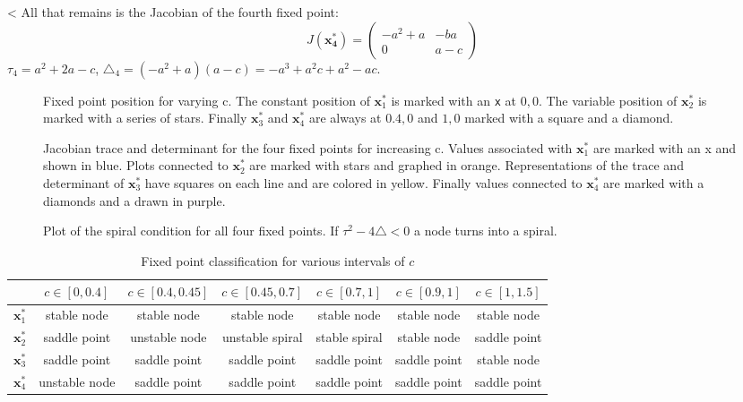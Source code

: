 <
All that remains is the Jacobian of the fourth fixed point:
\begin{equation}
J(\mathbf{x_4^*}) = \begin{pmatrix}
-a ^2 + a & -ba \\
0 & a-c 
\end{pmatrix}
\label{eq:Jx4}
\end{equation}
$\tau_4 = a^2 + 2a -c$, $\triangle_4 = (-a ^2 + a)(a-c)= -a^3 + a^2c + a^2 - ac$. 

\begin{figure}
\centering

\caption{Fixed point position for varying c. The constant position of $\mathbf{x}_1^*$ is marked with an \texttt{x} at $0,0$. The variable position of $\mathbf{x}_2^*$ is marked with a series of stars. Finally $\mathbf{x}_3^*$ and $\mathbf{x}_4^*$ are always at $0.4,0$ and $1,0$ marked with a square and a diamond.}




\caption{Jacobian trace and determinant for the four fixed points for increasing c. Values associated with $\mathbf{x}_1^*$ are marked with an x and shown in blue. Plots connected to $\mathbf{x}_2^*$ are marked with stars and graphed in orange. Representations of the trace and determinant of $\mathbf{x}_3^*$ have squares on each line and are colored in yellow. Finally values connected to $\mathbf{x}_4^*$ are marked with a diamonds and a drawn in purple.}
\end{figure}
\begin{figure}
\centering

\caption{Plot of the spiral condition for all four fixed points. If $\tau^2 - 4\triangle < 0$ a node turns into a spiral.}
\end{figure}

\begin{table}
\begin{tabular}{|c|c|c|c|c|c|c|}
\hline
				 &	$c \in [0,0.4] $ & $c \in [0.4,0.45] $ & $c \in [0.45,0.7] $ & $c \in [0.7,1]$ & $c \in [0.9,1]$ & $c \in [1,1.5] $  \\
\hline
$\mathbf{x}_1^*$ &	stable node		 &	stable node		   &	stable node 	 &	 stable node   & stable node  & stable node  	\\
\hline
$\mathbf{x}_2^*$ &	saddle point	 &	unstable node	   &	unstable spiral	 & stable spiral   & stable node  &	saddle point   \\
\hline
$\mathbf{x}_3^*$ &	saddle point	 & saddle point		   &    saddle point	 &	saddle point   & saddle point & stable node		\\
\hline
$\mathbf{x}_4^*$ &	unstable node	 &	saddle point	   &	saddle point	 & saddle point	   & saddle point & saddle point   \\
\hline
\end{tabular}
\caption{Fixed point classification for various intervals of $c$}
\end{table}

